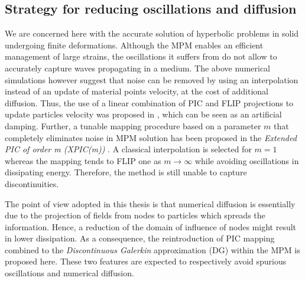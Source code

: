  
\subsection{Strategy for reducing oscillations and diffusion}
We are concerned here with the accurate solution of hyperbolic problems in solid undergoing finite deformations. Although the MPM enables an efficient management of large strains, the oscillations it suffers from do not allow to accurately capture waves propagating in a medium. The above numerical simulations however suggest that noise can be removed by using an interpolation instead of an update of material points velocity, at the cost of additional diffusion. Thus, the use of  a linear combination of PIC and FLIP projections to update particles velocity was proposed in \cite{Nairn}, which can be seen as an artificial damping. Further, a tunable mapping procedure based on a parameter $m$ that completely eliminates noise in MPM solution has been proposed in the \textit{Extended PIC of order m (XPIC(m))} \cite{XPIC}. A classical interpolation is selected for $m=1$ whereas the mapping tends to FLIP one as $m \rightarrow \infty$ while avoiding oscillations in dissipating energy. Therefore, the method is still unable to capture discontinuities.

The point of view adopted in this thesis is that numerical diffusion is essentially due to the projection of fields from nodes to particles which spreads the information. Hence, a reduction of the domain of influence of nodes might result in lower dissipation. As a consequence, the reintroduction of PIC mapping combined to the \textit{Discontinuous Galerkin} approximation (DG) within the MPM is proposed here. These two features are expected to respectively avoid spurious oscillations and numerical diffusion.


